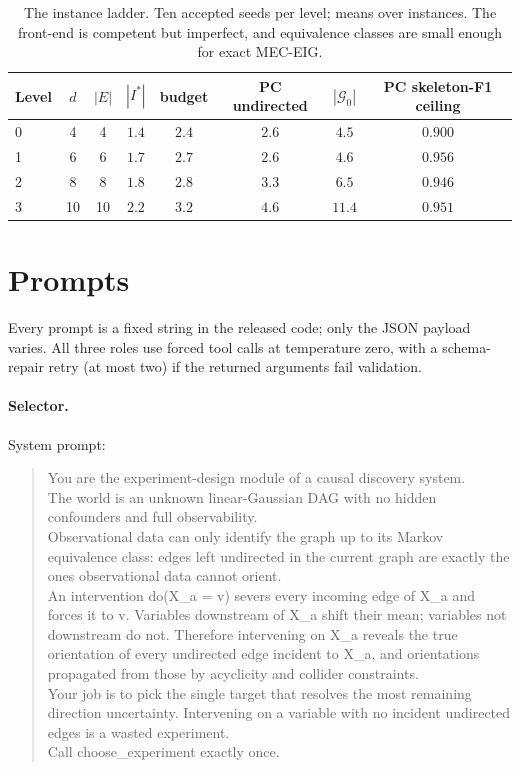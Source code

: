 \documentclass{article}
\begin{document}
\begin{table}[h]
\caption{The instance ladder. Ten accepted seeds per level; means over instances. The
front-end is competent but imperfect, and equivalence classes are small enough for exact
MEC-EIG.}
\label{tab:ladder}
\centering
\small
\begin{tabular}{lccccccc}
\toprule
Level & $d$ & $|E|$ & $|I^*|$ & budget & PC undirected & $|\mathcal{G}_0|$ & PC skeleton-F1 ceiling \\
\midrule
0 & 4 & 4 & $1.4$ & $2.4$ & $2.6$ & $4.5$ & $0.900$ \\
1 & 6 & 6 & $1.7$ & $2.7$ & $2.6$ & $4.6$ & $0.956$ \\
2 & 8 & 8 & $1.8$ & $2.8$ & $3.3$ & $6.5$ & $0.946$ \\
3 & 10 & 10 & $2.2$ & $3.2$ & $4.6$ & $11.4$ & $0.951$ \\
\bottomrule
\end{tabular}
\end{table}

\section{Prompts}
\label{app:prompts}

Every prompt is a fixed string in the released code; only the JSON payload varies. All three
roles use forced tool calls at temperature zero, with a schema-repair retry (at most two) if
the returned arguments fail validation.

\paragraph{Selector.} System prompt:

\begin{quote}\small\ttfamily\raggedright
You are the experiment-design module of a causal discovery system.\\
The world is an unknown linear-Gaussian DAG with no hidden confounders and full
observability.\\
Observational data can only identify the graph up to its Markov equivalence class: edges left
undirected in the current graph are exactly the ones observational data cannot orient.\\
An intervention do(X\_a = v) severs every incoming edge of X\_a and forces it to v. Variables
downstream of X\_a shift their mean; variables not downstream do not. Therefore intervening on
X\_a reveals the true orientation of every undirected edge incident to X\_a, and orientations
propagated from those by acyclicity and collider constraints.\\
Your job is to pick the single target that resolves the most remaining direction uncertainty.
Intervening on a variable with no incident undirected edges is a wasted experiment.\\
Call choose\_experiment exactly once.
\end{quote}
\end{document}
